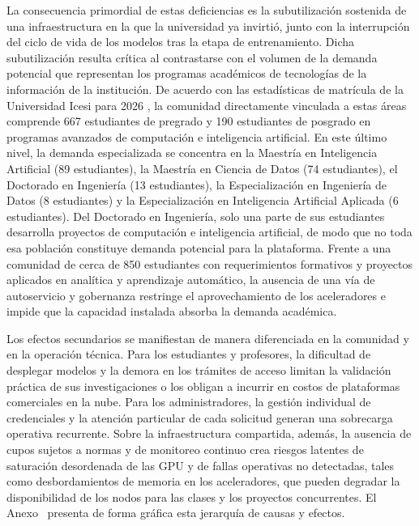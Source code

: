 La consecuencia primordial de estas deficiencias es la subutilización sostenida de una infraestructura en la que la universidad ya invirtió, junto con la interrupción del ciclo de vida de los modelos tras la etapa de entrenamiento. Dicha subutilización resulta crítica al contrastarse con el volumen de la demanda potencial que representan los programas académicos de tecnologías de la información de la institución. De acuerdo con las estadísticas de matrícula de la Universidad Icesi para 2026 \citep{icesi-matricula-2026}, la comunidad directamente vinculada a estas áreas comprende 667 estudiantes de pregrado y 190 estudiantes de posgrado en programas avanzados de computación e inteligencia artificial. En este último nivel, la demanda especializada se concentra en la Maestría en Inteligencia Artificial (89 estudiantes), la Maestría en Ciencia de Datos (74 estudiantes), el Doctorado en Ingeniería (13 estudiantes), la Especialización en Ingeniería de Datos (8 estudiantes) y la Especialización en Inteligencia Artificial Aplicada (6 estudiantes). Del Doctorado en Ingeniería, solo una parte de sus estudiantes desarrolla proyectos de computación e inteligencia artificial, de modo que no toda esa población constituye demanda potencial para la plataforma. Frente a una comunidad de cerca de 850 estudiantes con requerimientos formativos y proyectos aplicados en analítica y aprendizaje automático, la ausencia de una vía de autoservicio y gobernanza restringe el aprovechamiento de los aceleradores e impide que la capacidad instalada absorba la demanda académica.

Los efectos secundarios se manifiestan de manera diferenciada en la comunidad y en la operación técnica. Para los estudiantes y profesores, la dificultad de desplegar modelos y la demora en los trámites de acceso limitan la validación práctica de sus investigaciones o los obligan a incurrir en costos de plataformas comerciales en la nube. Para los administradores, la gestión individual de credenciales y la atención particular de cada solicitud generan una sobrecarga operativa recurrente. Sobre la infraestructura compartida, además, la ausencia de cupos sujetos a normas y de monitoreo continuo crea riesgos latentes de saturación desordenada de las GPU y de fallas operativas no detectadas, tales como desbordamientos de memoria en los aceleradores, que pueden degradar la disponibilidad de los nodos para las clases y los proyectos concurrentes. El Anexo~ presenta de forma gráfica esta jerarquía de causas y efectos.


